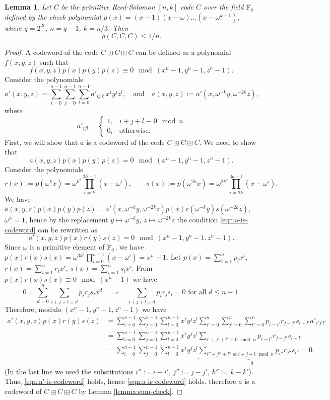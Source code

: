 \documentclass[11pt]{article}
\newtheorem{lemma}{Lemma}
\begin{document}
\begin{lemma}\label{lemma:not-expanding}
    Let $C$ be the primitive Reed-Solomon $[n,k]$ code $C$ over the field $\mathbb{F}_q$ defined by the check polynomial $p(x)=(x-1)(x-\omega)\ldots (x-\omega^{k-1})$, where $q=2^{2t}$, $n=q-1$, $k=n/3$. Then
    $$\rho(C,C,C) \le 1/n.$$
\end{lemma}
\begin{proof}
    A codeword of the code $C\boxplus C\boxplus C$ can be defined as a polynomial 
    $f(x,y,z)$ such that 
    $$f(x,y,z)p(x)p(y)p(z)\equiv 0\mod (x^n-1,y^n-1,z^n-1).$$ 
    Consider the polynomials 
    $$a'(x,y,z)=\sum_{i=0}^{n-1}\sum_{j=0}^{n-1}\sum_{l=0}^{n-1}a'_{ij\ell}x^iy^jz^l,\quad\mbox{and}\quad a(x,y,z):=a'(x,\omega^{-k}y,\omega^{-2k}z),$$
    where 
    $$a'_{ijl}=\begin{cases}1,&i+j+l\equiv 0\mod n\\0,&\mbox{otherwise}.\end{cases}$$
    First, we will show that $a$ is a codeword of the code $C\boxplus C\boxplus C$. We need to show that 
    \begin{equation}\label{eqn:a-is-codeword}
     a(x,y,z)p(x)p(y)p(z)=0\mod (x^n-1,y^n-1,z^n-1).
    \end{equation}
    Consider the polynomials 
    $$r(x):=p(\omega^k x)=\omega^{k^2}\prod_{i=k}^{2k-1}(x-\omega^i),\qquad s(x):=p(\omega^{2k}x)=\omega^{2k^2}\prod_{i=2k}^{3k-1}(x-\omega^i).$$
    We have $a(x,y,z)p(x)p(y)p(z)=a'(x,\omega^{-k}y,\omega^{-2k}z)p(x)r(\omega^{-k}y)s(\omega^{-2k}z)$, $\omega^n=1$, hence by the replacement $y\mapsto \omega^{-k}y$, $z\mapsto\omega^{-2k}z$ the condition \eqref{eqn:a-is-codeword} can be rewritten as
    \begin{equation}\label{eqn:a'-is-codeword}
     a'(x,y,z)p(x)r(y)s(z)=0\mod (x^n-1,y^n-1,z^n-1).
    \end{equation}
    Since $\omega$ is a primitive element of $\mathbb{F}_q$, we have $p(x)r(x)s(x)=\omega^{3k^2}\prod_{i=0}^{n-1}(x-\omega^i)=x^{n}-1$. Let $p(x)=\sum_{i=1}^np_ix^i$, $r(x)=\sum_{i=1}^nr_ix^i$, $s(x)=\sum_{i=1}^ns_ix^i$.
    From $p(x)r(x)s(x)\equiv 0\mod (x^n-1)$ we have
    $$0=\sum_{d=0}^n\sum_{i+j+l\equiv d}p_ir_js_lx^d\quad\Longrightarrow\quad \sum_{i+j+l\equiv d}p_ir_js_l=0\mbox{ for all }d\le n-1.$$
    Therefore, modulo $(x^n-1,y^n-1,z^n-1)$ we have
    \begin{align*}
    a'(x,y,z)p(x)r(y)s(z)&=\sum_{i=0}^{n-1}\sum_{j=0}^{n-1}\sum_{l=0}^{n-1}x^iy^jz^l\sum_{i'=0}^n\sum_{j'=0}^n\sum_{l'=0}^n p_{i-i'}r_{j-j'}s_{l-l'}a'_{i'j'l'}\\
    &=\sum_{i=0}^{n-1}\sum_{j=0}^{n-1}\sum_{l=0}^{n-1}x^iy^jz^l\sum_{i'+j'+l'\equiv 0\mod n} p_{i-i'}r_{j-j'}s_{l-l'}\\
    &=\sum_{i=0}^{n-1}\sum_{j=0}^{n-1}\sum_{l=0}^{n-1}x^iy^jz^l\underbrace{\sum_{i''+j''+l''\equiv i+j+l\mod n} p_{i''}r_{j''}s_{l''}}_{=0}=0.
    \end{align*}
    (In the last line we used the substitutions $i'':=i-i'$, $j'':=j-j'$, $k'':=k-k'$).
    Thus, \eqref{eqn:a'-is-codeword} holds, hence \eqref{eqn:a-is-codeword} holds, therefore $a$ is a codeword of $C\boxplus C\boxplus C$ by Lemma \ref{lemma:sum-check}.


\end{proof}
\end{document}
